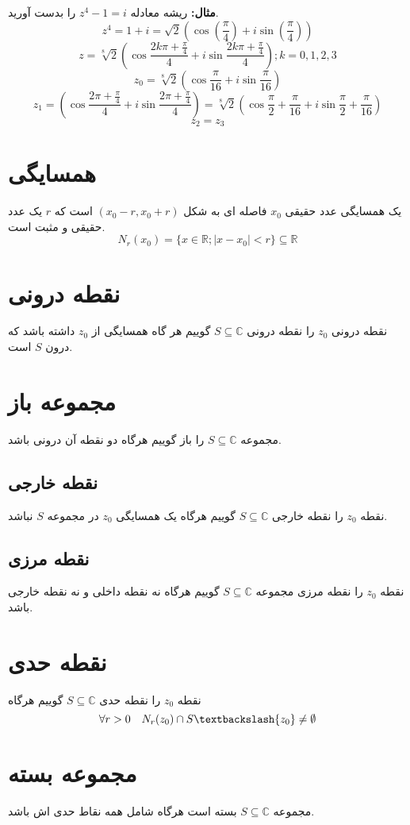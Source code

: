 \documentclass[12pt]{report}
\begin{document}
	 \textbf{مثال:}
	 ریشه معادله 
	 $z^4 - 1 = i$
	 را بدست آورید.
	 $$z^4 = 1 + i = \sqrt{2}(\cos (\frac{ \pi}{4}) + i \sin (\frac{ \pi}{4}))$$
	 $$z = \sqrt[8]{2} (\cos \frac{2k\pi + \frac{ \pi}{4}}{4} + i \sin \frac{2k\pi + \frac{ \pi}{4}}{4}) ; k = 0, 1, 2, 3$$
	 $$z_0=\sqrt[8]{2} (\cos \frac{ \pi}{16} + i \sin \frac{ \pi}{16})$$
	 $$z_1 = (\cos \frac{ 2\pi + \frac{\pi}{4}}{4} + i \sin \frac{ 2\pi + \frac{\pi}{4}}{4}) = \sqrt[8]{2} (\cos \frac{\pi}{2}+\frac{ \pi}{16} + i \sin \frac{\pi}{2}+\frac{ \pi}{16})$$
	 $$ z_2 = z_3 $$
	 \section{همسایگی}
	 یک همسایگی عدد حقیقی
	 $x_0$
	 فاصله ای به شکل 
	 $(x_0 - r, x_0 + r)$
	 است که 
	 $r$
	 یک عدد حقیقی و مثبت است.
	 $$N_r(x_0 ) = \{x \in \mathbb{R}; |x-x_0| < r\} \subseteq \mathbb{R}$$
	 \section{نقطه درونی}
	 نقطه درونی 
	 $z_0$
	 را نقطه درونی 
	 $S \subseteq \mathbb{C}$
	 گوییم هر گاه همسایگی از 
	 $z_0$
	 داشته باشد که درون 
	 $S$
	 است.
	 \section{مجموعه باز}
	 مجموعه
	 $S \subseteq \mathbb{C}$
	 را باز گوییم هرگاه دو نقطه آن درونی باشد.
	 \subsection{نقطه  خارجی}
	 نقطه 
	 $z_0$
	 را نقطه خارجی 
	 	 $S \subseteq \mathbb{C}$
	 	 گوییم هرگاه یک همسایگی 
	 	 $z_0$
	 	 در مجموعه 
	 	 $S$
	 	 نباشد.
	 	 \subsection{نقطه مرزی}
	 	 نقطه 
	 	 $z_0$
	 	 را نقطه مرزی مجموعه 
	 	 	 	 $S \subseteq \mathbb{C}$
	 	 	 	 گوییم هرگاه نه نقطه داخلی و نه نقطه خارجی باشد.
	 	 	 	 \section{نقطه حدی}
	 	 	 	 نقطه 
	 	 	 	 $z_0$
	 	 	 	 را نقطه حدی 
	 	 	 	 	 	 $S \subseteq \mathbb{C}$
	 	 	 	 	 	 گوییم هرگاه
	 	 	 	 	 	 $$\forall r > 0 \quad N_r(z_0) \cap S \textbackslash \{z_0\} \neq \emptyset$$
	 	 	 	 	 	 \section{مجموعه بسته}
	 	 	 	 	 	 مجموعه
	 	 	 	 	 	 	 	 $S \subseteq \mathbb{C}$
	 	 	 	 	 	 	 	 بسته است هرگاه شامل همه نقاط حدی اش باشد.
\end{document}
